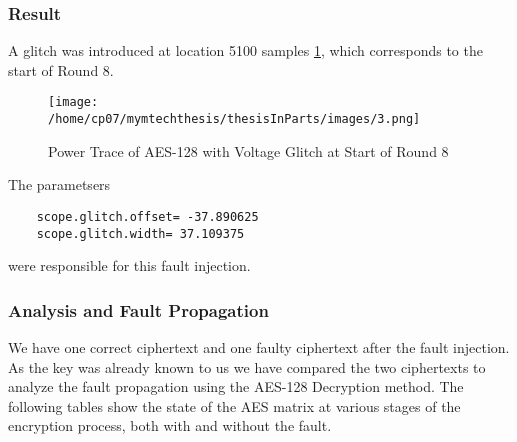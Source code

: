 \subsubsection{Result}
A glitch was introduced at location 5100 samples \ref{fig:voltage_glitch_trace}, which corresponds to the start of Round 8. 
\begin{figure}
    \centering
    \texttt{[image: /home/cp07/mymtechthesis/thesisInParts/images/3.png]}
    \caption{Power Trace of AES-128 with Voltage Glitch at Start of Round 8}
    \label{fig:voltage_glitch_trace}
\end{figure}
The parametsers 
\begin{verbatim}
    scope.glitch.offset= -37.890625 
    scope.glitch.width= 37.109375
\end{verbatim}
were responsible for this fault injection.

\subsubsection{Analysis and Fault Propagation}
We have one correct ciphertext and one faulty ciphertext after the fault injection. As the key was already known to us we have compared the two ciphertexts to analyze the fault propagation using the AES-128 Decryption method. The following tables show the state of the AES matrix at various stages of the encryption process, both with and without the fault.


